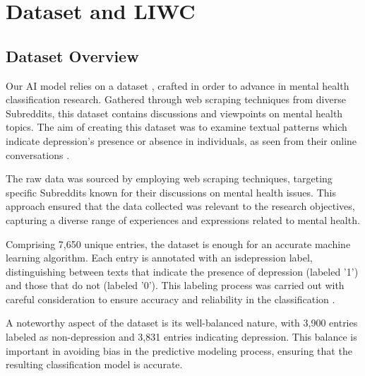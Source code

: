 \chapter{Dataset and LIWC}

\label{chap:ch3}

\par
\section{Dataset Overview}

\quad Our AI model relies on a dataset \cite{depressionDataset}, crafted in order to advance in mental health classification research. Gathered through web scraping techniques from diverse Subreddits, this dataset contains discussions and viewpoints on mental health topics. The aim of creating this dataset was to examine textual patterns which indicate depression's presence or absence in individuals, as seen from their online conversations .

The raw data was sourced by employing web scraping techniques, targeting specific Subreddits known for their discussions on mental health issues. This approach ensured that the data collected was relevant to the research objectives, capturing a diverse range of experiences and expressions related to mental health.

Comprising 7,650 unique entries, the dataset is enough for an accurate machine learning algorithm. Each entry is annotated with an is\textunderscore depression label, distinguishing between texts that indicate the presence of depression (labeled '1') and those that do not (labeled '0'). This labeling process was carried out with careful consideration to ensure accuracy and reliability in the classification \cite{depressionDataset}.

A noteworthy aspect of the dataset is its well-balanced nature, with 3,900 entries labeled as non-depression and 3,831 entries indicating depression. This balance is important in avoiding bias in the predictive modeling process, ensuring that the resulting classification model is accurate.

